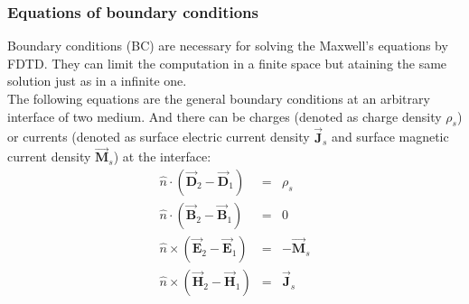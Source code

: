     \subsubsection{Equations of boundary conditions}\label{subsubsec:Equations of BC}
	  Boundary conditions (BC) are necessary for solving the  Maxwell's equations by FDTD. They can limit the computation in a finite space but ataining the same solution just as in a infinite one.  \\
	  The following equations are the general boundary conditions at an arbitrary interface of two medium. And there can be  charges (denoted as charge density $\rho_s$) or  currents (denoted as surface electric current density $\vec{\mathbf{J}}_s$ and  surface magnetic current density $\vec{\mathbf{M}}_s$) at the interface:
	      \begin{eqnarray}
		  \hat{n}\cdot(\vec{\mathbf{D}}_2-\vec{\mathbf{D}}_1) &=&\rho_s  \\
		  \hat{n}\cdot(\vec{\mathbf{B}}_2-\vec{\mathbf{B}}_1) &=&0  \\
		  \hat{n}\times(\vec{\mathbf{E}}_2-\vec{\mathbf{E}}_1) &=&-\vec{\mathbf{M}}_s \\
		  \hat{n}\times(\vec{\mathbf{H}}_2-\vec{\mathbf{H}}_1) &=&\vec{\mathbf{J}}_s
		  \label{eq:General boundary conditions}
	      \end{eqnarray}
